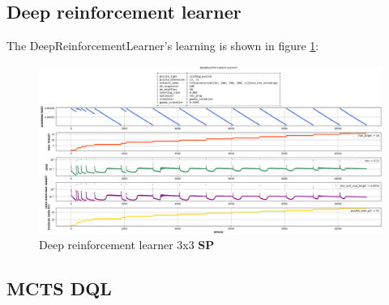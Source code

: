 \subsection{Deep reinforcement learner}
 The DeepReinforcementLearner's learning is shown in figure \ref{fig:33SPDeepReinforcementLearning}:

\begin{landscape}
\centering\vspace*{\fill}
\begin{figure}[H]
\centering
\includegraphics[align=c, scale=0.55]{./Figures/33SPDeepReinforcementLearning}
\caption[33SPDeepReinforcementLearning]{Deep reinforcement learner 3x3 \textbf{SP}}
\label{fig:33SPDeepReinforcementLearning}
\end{figure}
\vfill
\end{landscape}
\restoregeometry


\subsection{MCTS DQL}


